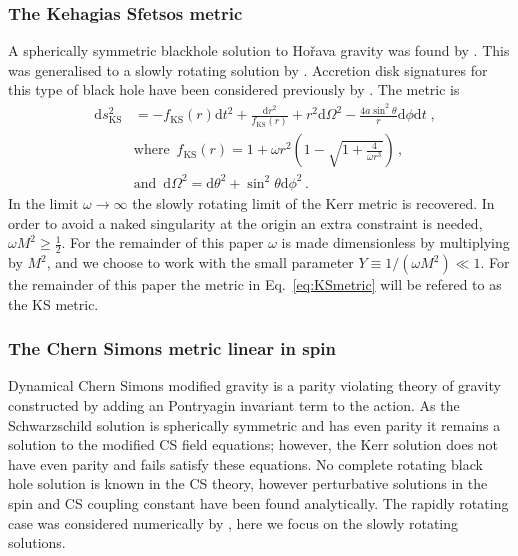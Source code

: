 \subsubsection{The Kehagias Sfetsos metric}\label{subsec:KS}
A spherically symmetric blackhole solution to Ho\v{r}ava gravity \citep{2009PhRvL.102p1301H,2009PhRvD..79h4008H} was found by \cite{2009PhLB..678..123K}. This was generalised to a slowly rotating solution by \cite{2010EPJC...70..367L}. Accretion disk signatures for this type of black hole have been considered previously by \cite{2011CQGra..28p5001H}. The metric is
\begin{eqnarray}\label{eq:KSmetric} 
&\textrm{d}s^{2}_{\textrm{KS}}&=-f_{\textrm{KS}}(r)\textrm{d}t^{2}+\frac{\textrm{d}r^{2}}{f_{\textrm{KS}}(r)}+r^{2}\textrm{d}\Omega^{2}-\frac{4a\sin^{2}\theta}{r}\textrm{d}\phi\textrm{d}t\; , \nonumber\\
&&\textrm{where }\, f_{\textrm{KS}}(r)=1+\omega r^{2}\left(1-\sqrt{1+\frac{4}{\omega r^{3}}}\right)\,, \nonumber \\
&&\textrm{and }\,\textrm{d}\Omega^{2}=\textrm{d}\theta^{2}+\sin^{2}\theta\textrm{d}\phi^{2}\, .\end{eqnarray}
In the limit $\omega \rightarrow \infty$ the slowly rotating limit of the Kerr metric is recovered. In order to avoid a naked singularity at the origin an extra constraint is needed, $\omega M^{2} \geq \frac{1}{2}$. For the remainder of this paper $\omega$ is made dimensionless by multiplying by $M^{2}$, and we choose to work with the small parameter $Y\equiv 1/(\omega M^{2})\ll 1$. For the remainder of this paper the metric in Eq.\ \ref{eq:KSmetric} will be refered to as the KS metric.


\subsubsection{The Chern Simons metric linear in spin}\label{subsec:CS1}
Dynamical Chern Simons modified gravity \cite{2003PhRvD..68j4012J} is a parity violating theory of gravity constructed by adding an Pontryagin invariant term to the action. As the Schwarzschild solution is spherically symmetric and has even parity it remains a solution to the modified CS field equations; however, the Kerr solution does not have even parity and fails satisfy these equations. No complete rotating black hole solution is known in the CS theory, however perturbative solutions in the spin and CS coupling constant have been found analytically. The rapidly rotating case was considered numerically by \cite{2014arXiv1407.2350S}, here we focus on the slowly rotating solutions.

